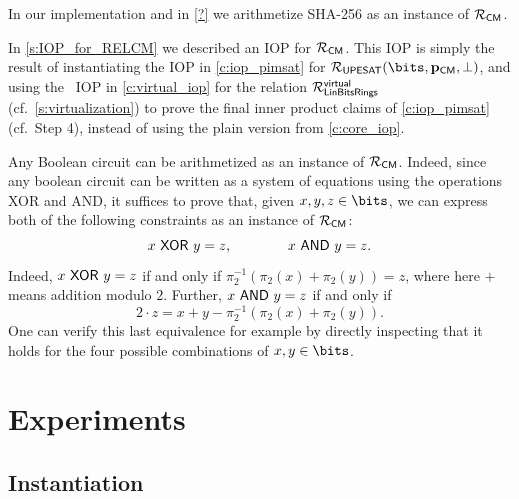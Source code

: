 \documentclass[11pt,letterpaper,usenames,dvipsnames]{article}
\begin{document}
In our implementation and in \cref{?} we arithmetize SHA-256 as an instance of $\mathcal{R}_{\mathsf{CM}}$. 


In \cref{s:IOP_for_RELCM}  we described an IOP for $\mathcal{R}_{\mathsf{CM}}$. This IOP is simply the result of instantiating the IOP in \cref{c:iop_pimsat} for  $\PIMSAT(\bits, \pp_{\mathsf{CM}}, \bot)$, and using  the \ftwoz \ IOP in \cref{c:virtual_iop} for the relation $\mathcal{R}_{\mathsf{LinBitsRings}}^{\mathsf{virtual}}$  (cf.\ \cref{s:virtualization}) to prove the final inner product claims of \cref{c:iop_pimsat} (cf.\ Step 4), instead of using the plain \ftwoz version from \cref{c:core_iop}.


\begin{remark}

Any Boolean circuit can be arithmetized as an instance of $\mathcal{R}_{\mathsf{CM}}$. Indeed, since any boolean circuit can be written as a system of equations using the operations XOR and AND, it suffices to prove that, given $x,y,z\in \bits$, we can express both of the following constraints as an instance of $\mathcal{R}_{\mathsf{CM}}$:
%
$$    x \ \mathsf{XOR}\  y = z,\qquad \qquad 
    x \ \mathsf{AND}\  y = z.
$$
Indeed, $x \ \mathsf{XOR}\  y = z$ if and only if $\pi_2^{-1}(\pi_2(x) + \pi_2(y))=z$, where here $+$ means addition modulo $2$. Further, $x \ \mathsf{AND}\  y = z$  if and only if  
%
$$
2\cdot z =  x+y - \pi_2^{-1}(\pi_2(x) + \pi_2(y)).
$$    
One can verify this last equivalence for example  by directly inspecting that it holds for the four possible combinations of $x,y\in \bits$.
\end{remark}





\section{Experiments}
\subsection{Instantiation}
\end{document}
